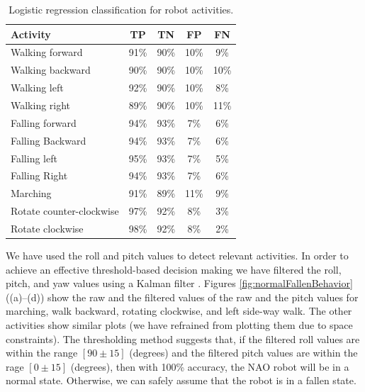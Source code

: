 \documentclass[letterpaper]{article}
\begin{document}
\begin{table}[!ht]
\caption{Logistic regression classification for robot activities.}
	\label{tab:robot-logistic-class}
	\centering
		\begin{tabular} {| l | c | c | c| c|}
		\hline
			{\bf Activity} & {\bf  TP}  &	{\bf TN}  &	{\bf FP} &	{\bf FN} \\ 
\hline
			Walking forward	& 91\%	& 90\%	& 10\%	& 9\% \\ \hline
			Walking backward	& 90\%	& 90\%	& 10\%	& 10\% \\ \hline
			Walking left 	& 92\%	& 90\%	& 10\%	& 8\% \\ \hline
			Walking right 	& 89\%	& 90\%	& 10\%	& 11\% \\ \hline
			Falling forward	& 94\%	& 93\%	& 7\%	& 6\%	 \\ \hline
			Falling Backward	& 94\%	& 93\%	& 7\%	& 6\%	 \\ \hline
			Falling left	& 95\%	& 93\%	& 7\%	& 5\%	 \\ \hline
			Falling Right	& 94\%	& 93\%	& 7\%	& 6\%	 \\ \hline
			Marching	& 91\%	& 89\%	& 11\%	& 9\%	 \\ \hline
			Rotate counter-clockwise	& 97\%	& 92\%	& 8\%	& 3\%	 \\ \hline
			Rotate clockwise	& 98\%	& 92\%	& 8\%	& 2\%	 \\ \hline
		\end{tabular}
\end{table}

We have used the roll and pitch values to detect relevant activities. In order to achieve 
an effective threshold-based decision making we have filtered the roll, pitch, and
yaw values using a Kalman filter \cite{Welch:1995:IKF:897831}. Figures 
\ref{fig:normalFallenBehavior} ((a)--(d)) show
the raw and the filtered values of the raw and the pitch values for marching, walk backward,
rotating clockwise, and left side-way walk. The other activities show similar plots (we have 
refrained from plotting them due to space constraints). The thresholding method
suggests that, if the filtered roll values are within the range $[90\pm15]$ (degrees) and the
filtered pitch values are within the rage $[0\pm15]$ (degrees), then with 100\% accuracy, the NAO 
 robot will be in a normal state. Otherwise, we can safely assume that the robot is in 
a fallen state.   
\end{document}
